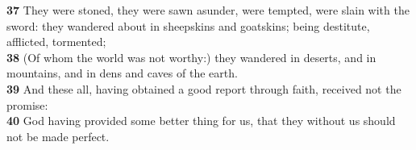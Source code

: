 \documentclass[10pt]{article} %
\begin{document}
{\begin{minipage}[t]{0.45\textwidth}
\textbf{\scriptsize 37} They were stoned, they were sawn asunder, were tempted, were slain with the sword: they wandered about in sheepskins and goatskins; being destitute, afflicted, tormented;\\
\textbf{\scriptsize 38} (Of whom the world was not worthy:) they wandered in deserts, and in mountains, and in dens and caves of the earth.\\
\textbf{\scriptsize 39} And these all, having obtained a good report through faith, received not the promise:\\
\textbf{\scriptsize 40} God having provided some better thing for us, that they without us should not be made perfect.\\
\end{minipage}}
\vspace*{\fill}
\newpage\Huge
\vspace*{\fill}
\singlespacing %
\end{document}
